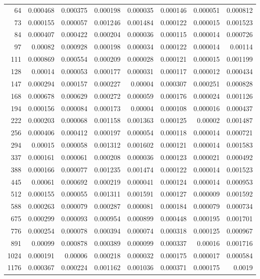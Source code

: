 \begin{longtable}{r r r r r r r r}
64 & 0.000468 & 0.000375 & 0.000198 & 0.000035 & 0.000146 & 0.000051 & 0.000812 \\
73 & 0.000155 & 0.000057 & 0.001246 & 0.001484 & 0.000122 & 0.000015 & 0.001523 \\
84 & 0.000407 & 0.000422 & 0.000204 & 0.000036 & 0.000115 & 0.000014 & 0.000726 \\
97 & 0.00082 & 0.000928 & 0.000198 & 0.000034 & 0.000122 & 0.000014 & 0.00114 \\
111 & 0.000869 & 0.000554 & 0.000209 & 0.000028 & 0.000121 & 0.000015 & 0.001199 \\
128 & 0.00014 & 0.000053 & 0.000177 & 0.000031 & 0.000117 & 0.000012 & 0.000434 \\
147 & 0.000294 & 0.000157 & 0.000227 & 0.00004 & 0.000307 & 0.000251 & 0.000828 \\
168 & 0.000678 & 0.000629 & 0.000272 & 0.000059 & 0.000176 & 0.000024 & 0.001126 \\
194 & 0.000156 & 0.000084 & 0.000173 & 0.00004 & 0.000108 & 0.000016 & 0.000437 \\
222 & 0.000203 & 0.000068 & 0.001158 & 0.001363 & 0.000125 & 0.00002 & 0.001487 \\
256 & 0.000406 & 0.000412 & 0.000197 & 0.000054 & 0.000118 & 0.000014 & 0.000721 \\
294 & 0.00015 & 0.000058 & 0.001312 & 0.001602 & 0.000121 & 0.000014 & 0.001583 \\
337 & 0.000161 & 0.000061 & 0.000208 & 0.000036 & 0.000123 & 0.000021 & 0.000492 \\
388 & 0.000166 & 0.000077 & 0.001235 & 0.001474 & 0.000122 & 0.000014 & 0.001523 \\
445 & 0.00061 & 0.000692 & 0.000219 & 0.000041 & 0.000124 & 0.000014 & 0.000953 \\
512 & 0.000155 & 0.000055 & 0.001311 & 0.001591 & 0.000127 & 0.000009 & 0.001592 \\
588 & 0.000263 & 0.000079 & 0.000287 & 0.000081 & 0.000184 & 0.000079 & 0.000734 \\
675 & 0.000299 & 0.000093 & 0.000954 & 0.000899 & 0.000448 & 0.000195 & 0.001701 \\
776 & 0.000254 & 0.000078 & 0.000394 & 0.000074 & 0.000318 & 0.000125 & 0.000967 \\
891 & 0.00099 & 0.000878 & 0.000389 & 0.000099 & 0.000337 & 0.00016 & 0.001716 \\
1024 & 0.000191 & 0.00006 & 0.000218 & 0.000032 & 0.000175 & 0.000017 & 0.000584 \\
1176 & 0.000367 & 0.000224 & 0.001162 & 0.001036 & 0.000371 & 0.000175 & 0.0019 \\

\end{longtable}
